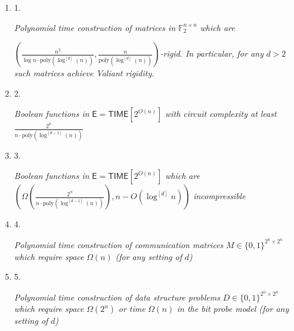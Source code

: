 \begin{enumerate}


\item[] 
1. 


\emph{Polynomial time construction of matrices in }$\mathbb{F}_{2}^{n\times n}$\emph{ which are }

$(\frac{n^{2}}{\log n\cdot\mathrm{poly}(\log^{[d]}(n))},\frac{n}{\mathrm{poly}(\log^{[d]}(n))})$\emph{-rigid. In particular, for any }$d>2$\emph{ such matrices achieve Valiant rigidity.}\par





\item[] 
2. 


\emph{Boolean functions in }$\mathsf{E}={\mathsf{TIME}}[2^{O(n)}]$\emph{ with circuit complexity at least }$\frac{2^{n}}{n\cdot\mathrm{poly}(\log^{[d-1]}(n))}$\emph{}\par





\item[] 
3. 


\emph{Boolean functions in }$\mathsf{E}={\mathsf{TIME}}[2^{O(n)}]$\emph{ which are }${(\Omega(\frac{2^{n}}{n\cdot\mathrm{poly}(\log^{[d-1]}(n))}),n-O(\log^{[d]}n))}$\emph{ incompressible}\par





\item[] 
4. 


\emph{Polynomial time construction of communication matrices }$M\in\{0,1\}^{2^{n}\times 2^{n}}$\emph{ which require space }$\Omega(n)$\emph{ (for any setting of }$d$\emph{)}\par





\item[] 
5. 


\emph{Polynomial time construction of data structure problems }$D\in\{0,1\}^{2^{n}\times 2^{n}}$\emph{ which require space }$\Omega(2^{n})$\emph{ or time }$\Omega(n)$\emph{ in the bit probe model (for any setting of }$d$\emph{)}\par





\end{enumerate}


